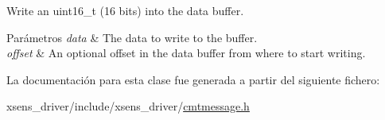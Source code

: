 \-Write an uint16\-\_\-t (16 bits) into the data buffer. 


\begin{DoxyParams}{\-Parámetros}
{\em data} & \-The data to write to the buffer. \\
\hline
{\em offset} & \-An optional offset in the data buffer from where to start writing. \\
\hline
\end{DoxyParams}


\-La documentación para esta clase fue generada a partir del siguiente fichero\-:\begin{DoxyCompactItemize}
\item 
xsens\-\_\-driver/include/xsens\-\_\-driver/\hyperlink{cmtmessage_8h}{cmtmessage.\-h}\end{DoxyCompactItemize}

